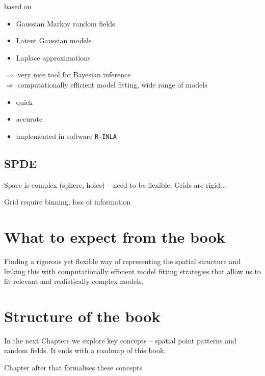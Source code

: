based on 
\begin{itemize}
\item Gaussian Markov random fields 
\item Latent Gaussian models
\item Laplace approximations 
\end{itemize}
$\Rightarrow$ very nice tool for Bayesian inference\\ 
$\Rightarrow$ computationally efficient model fitting, wide range of models
\begin{itemize}
\item quick 
\item accurate 
\item implemented in software \texttt{R-INLA}
\end{itemize}

\subsection{SPDE}

Space is complex (sphere, holes) -- need to be flexible. Grids are rigid... 

Grid require binning, loss of information




\section{What to expect from the book}

Finding a rigorous yet flexible way of representing the spatial structure and linking this with computationally efficient model fitting strategies that allow us to fit relevant and realistically complex models.



\section{Structure of the book}

In the next Chapters we explore key concepts  -- spatial point patterns and random fields. It ends with a roadmap of this book.
 
Chapter after that formalises these concepts



